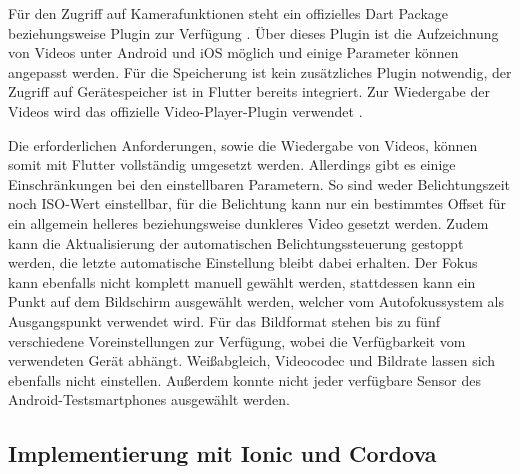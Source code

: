 Für den Zugriff auf Kamerafunktionen steht ein offizielles Dart Package beziehungsweise Plugin zur Verfügung \cite{Dart_Camera}.
Über dieses Plugin ist die Aufzeichnung von Videos unter Android und iOS möglich und einige Parameter können angepasst werden.
Für die Speicherung ist kein zusätzliches Plugin notwendig, der Zugriff auf Gerätespeicher ist in Flutter bereits integriert.
Zur Wiedergabe der Videos wird das offizielle Video-Player-Plugin verwendet \cite{Dart_Video}.

Die erforderlichen Anforderungen, sowie die Wiedergabe von Videos, können somit mit Flutter vollständig umgesetzt werden.
Allerdings gibt es einige Einschränkungen bei den einstellbaren Parametern.
So sind weder Belichtungszeit noch ISO-Wert einstellbar, für die Belichtung kann nur ein bestimmtes Offset für ein allgemein helleres beziehungsweise dunkleres Video gesetzt werden.
Zudem kann die Aktualisierung der automatischen Belichtungssteuerung gestoppt werden, die letzte automatische Einstellung bleibt dabei erhalten.
Der Fokus kann ebenfalls nicht komplett manuell gewählt werden, stattdessen kann ein Punkt auf dem Bildschirm ausgewählt werden, welcher vom Autofokussystem als Ausgangspunkt verwendet wird.
Für das Bildformat stehen bis zu fünf verschiedene Voreinstellungen zur Verfügung, wobei die Verfügbarkeit vom verwendeten Gerät abhängt.
Weißabgleich, Videocodec und Bildrate lassen sich ebenfalls nicht einstellen.
Außerdem konnte nicht jeder verfügbare Sensor des Android-Testsmartphones ausgewählt werden.


\subsection{Implementierung mit Ionic und Cordova}
\label{sec:evaluation_ionic}


